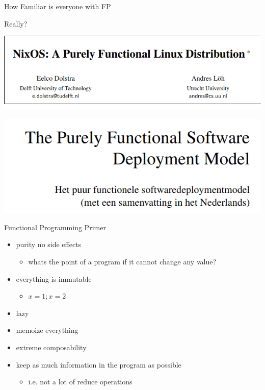 \documentclass[presentation]{beamer}
\begin{document}
\begin{frame}[label={sec:org583bd86},fragile]{How Familiar is everyone with FP}
\begin{block}{Really?}
\begin{center}
\includegraphics[width=.9\linewidth]{./images/screenshot-13.png}
\end{center}

\begin{center}
\includegraphics[width=.9\linewidth]{./images/screenshot-14.png}
\end{center}
\end{block}
\begin{block}{Functional Programming Primer}
\begin{itemize}
\item purity no side effects
\begin{itemize}
\item whats the point of a program if it cannot change any value?
\end{itemize}
\item everything is immutable
\begin{itemize}
\item \(x = 1; x = 2\)
\end{itemize}
\item lazy
\item memoize everything
\item extreme composability
\item keep as much information in the program as possible
\begin{itemize}
\item i.e. not a lot of reduce operations
\end{itemize}
\end{itemize}
\end{block}
\end{frame}
\end{document}
